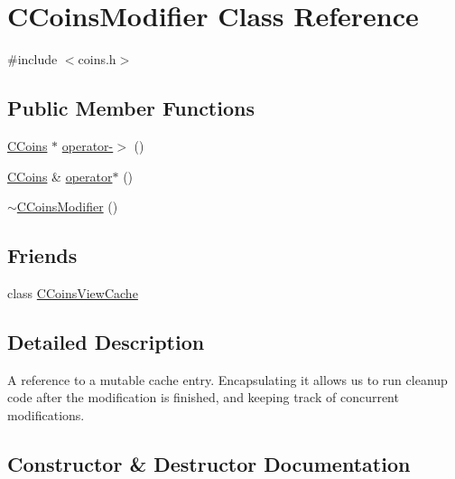 \hypertarget{class_c_coins_modifier}{}\section{C\+Coins\+Modifier Class Reference}
\label{class_c_coins_modifier}


{\ttfamily \#include $<$coins.\+h$>$}

\subsection*{Public Member Functions}
\begin{DoxyCompactItemize}
\item 
\hyperlink{class_c_coins}{C\+Coins} $\ast$ \hyperlink{class_c_coins_modifier_a5831f586921460e6ec26635cb92c12f6}{operator-\/$>$} ()
\item 
\hyperlink{class_c_coins}{C\+Coins} \& \hyperlink{class_c_coins_modifier_a403cd7eb708f8c744598ad890bcce1b5}{operator$\ast$} ()
\item 
\hyperlink{class_c_coins_modifier_aacb75869fd2cabec97645eb46f42e98b}{$\sim$\+C\+Coins\+Modifier} ()
\end{DoxyCompactItemize}
\subsection*{Friends}
\begin{DoxyCompactItemize}
\item 
class \hyperlink{class_c_coins_modifier_a1a8530a17e2e3f56e97217784400ee46}{C\+Coins\+View\+Cache}
\end{DoxyCompactItemize}


\subsection{Detailed Description}
A reference to a mutable cache entry. Encapsulating it allows us to run cleanup code after the modification is finished, and keeping track of concurrent modifications. 

\subsection{Constructor \& Destructor Documentation}
\hypertarget{class_c_coins_modifier_aacb75869fd2cabec97645eb46f42e98b}{}
